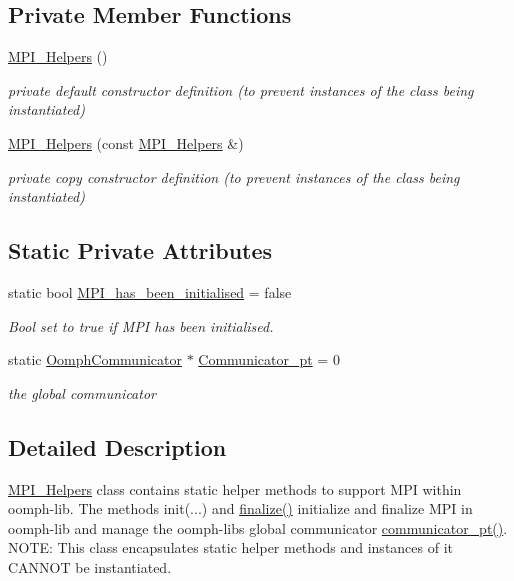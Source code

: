 \subsection*{Private Member Functions}
\begin{DoxyCompactItemize}
\item 
\hyperlink{classoomph_1_1MPI__Helpers_afb01ddfbe038936ec832cdbea6e677e8}{M\+P\+I\+\_\+\+Helpers} ()
\begin{DoxyCompactList}\small\item\em private default constructor definition (to prevent instances of the class being instantiated) \end{DoxyCompactList}\item 
\hyperlink{classoomph_1_1MPI__Helpers_acf521b68d094e6a88a8bf14f8ebe3185}{M\+P\+I\+\_\+\+Helpers} (const \hyperlink{classoomph_1_1MPI__Helpers}{M\+P\+I\+\_\+\+Helpers} \&)
\begin{DoxyCompactList}\small\item\em private copy constructor definition (to prevent instances of the class being instantiated) \end{DoxyCompactList}\end{DoxyCompactItemize}
\subsection*{Static Private Attributes}
\begin{DoxyCompactItemize}
\item 
static bool \hyperlink{classoomph_1_1MPI__Helpers_aa8d80db3f7a06074ff4a92e3bb4ab91d}{M\+P\+I\+\_\+has\+\_\+been\+\_\+initialised} = false
\begin{DoxyCompactList}\small\item\em Bool set to true if M\+PI has been initialised. \end{DoxyCompactList}\item 
static \hyperlink{classoomph_1_1OomphCommunicator}{Oomph\+Communicator} $\ast$ \hyperlink{classoomph_1_1MPI__Helpers_a78e44036f7979616432483c805e2c93c}{Communicator\+\_\+pt} = 0
\begin{DoxyCompactList}\small\item\em the global communicator \end{DoxyCompactList}\end{DoxyCompactItemize}


\subsection{Detailed Description}
\hyperlink{classoomph_1_1MPI__Helpers}{M\+P\+I\+\_\+\+Helpers} class contains static helper methods to support M\+PI within oomph-\/lib. The methods init(...) and \hyperlink{classoomph_1_1MPI__Helpers_a471bc4697fd5edeea3fb4af1bba0e541}{finalize()} initialize and finalize M\+PI in oomph-\/lib and manage the oomph-\/libs global communicator \hyperlink{classoomph_1_1MPI__Helpers_ac16964b22bfd4f657490802beb600ffe}{communicator\+\_\+pt()}. N\+O\+TE\+: This class encapsulates static helper methods and instances of it C\+A\+N\+N\+OT be instantiated. 

